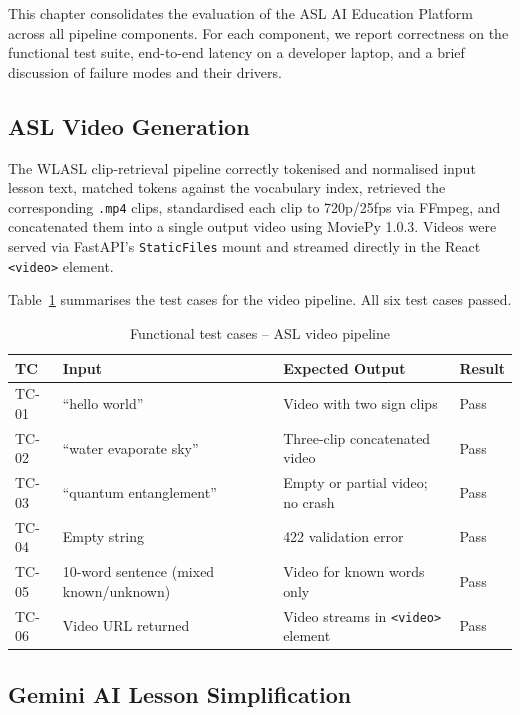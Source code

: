\documentclass[12pt,a4paper,oneside]{report}
\begin{document}
This chapter consolidates the evaluation of the ASL AI Education Platform across all pipeline components. For each component, we report correctness on the functional test suite, end-to-end latency on a developer laptop, and a brief discussion of failure modes and their drivers.

\subsection{ASL Video Generation}

The WLASL clip-retrieval pipeline correctly tokenised and normalised input lesson text, matched tokens against the vocabulary index, retrieved the corresponding \texttt{.mp4} clips, standardised each clip to 720p/25fps via FFmpeg, and concatenated them into a single output video using MoviePy 1.0.3. Videos were served via FastAPI's \texttt{StaticFiles} mount and streamed directly in the React \texttt{<video>} element.

Table~\ref{tab:video_test} summarises the test cases for the video pipeline. All six test cases passed.

\begin{table}[h]
\caption{Functional test cases -- ASL video pipeline}
\label{tab:video_test}
\centering
\small
\begin{tabularx}{\linewidth}{@{}lXXl@{}}
\toprule
\textbf{TC} & \textbf{Input} & \textbf{Expected Output} & \textbf{Result} \\
\midrule
TC-01 & ``hello world'' & Video with two sign clips & Pass \\
TC-02 & ``water evaporate sky'' & Three-clip concatenated video & Pass \\
TC-03 & ``quantum entanglement'' & Empty or partial video; no crash & Pass \\
TC-04 & Empty string & 422 validation error & Pass \\
TC-05 & 10-word sentence (mixed known/unknown) & Video for known words only & Pass \\
TC-06 & Video URL returned & Video streams in \texttt{<video>} element & Pass \\
\bottomrule
\end{tabularx}
\end{table}

\subsection{Gemini AI Lesson Simplification}
\end{document}
